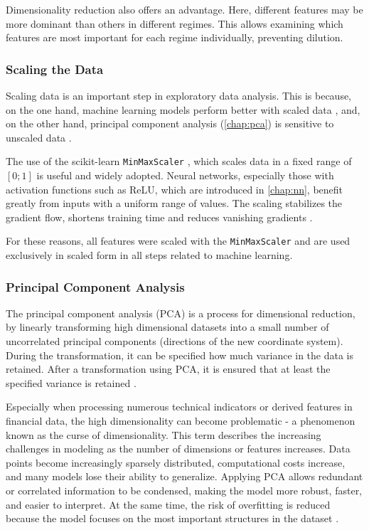 Dimensionality reduction also offers an advantage.
Here, different features may be more dominant than others in different regimes.
This allows examining which features are most important for each regime individually, preventing dilution.

\subsubsection{Scaling the Data}

Scaling data is an important step in exploratory data analysis.
This is because, on the one hand, machine learning models perform better with scaled data \cite{data-scaling}, and, on the other hand, principal component analysis (\autoref{chap:pca}) is sensitive to unscaled data \cite{pca-scaling}.

The use of the scikit-learn \texttt{MinMaxScaler} \cite{min-max}, which scales data in a fixed range of $[0; 1]$ is useful and widely adopted.
Neural networks, especially those with activation functions such as ReLU, which are introduced in \autoref{chap:nn}, benefit greatly from inputs with a uniform range of values.
The scaling stabilizes the gradient flow, shortens training time and reduces vanishing gradients \cite{min-max-benefits}.

For these reasons, all features were scaled with the \texttt{MinMaxScaler} and are used exclusively in scaled form in all steps related to machine learning.

\subsubsection{Principal Component Analysis}
\label{chap:pca}

The principal component analysis (PCA) is a process for dimensional reduction, by linearly transforming high dimensional datasets into a small number of uncorrelated principal components  (directions of the new coordinate system).
During the transformation, it can be specified how much variance in the data is retained.
After a transformation using PCA, it is ensured that at least the specified variance is retained \cite{wikipedia-pca}.

Especially when processing numerous technical indicators or derived features in financial data, the high dimensionality can become problematic - a phenomenon known as the curse of dimensionality.
This term describes the increasing challenges in modeling as the number of dimensions or features increases.
Data points become increasingly sparsely distributed, computational costs increase, and many models lose their ability to generalize.
Applying PCA allows redundant or correlated information to be condensed, making the model more robust, faster, and easier to interpret.
At the same time, the risk of overfitting is reduced because the model focuses on the most important structures in the dataset \cite{wikipedia-curse-od-dimensionality}.

